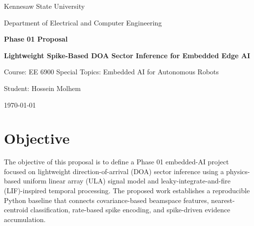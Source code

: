 \documentclass[11pt]{report}
\begin{document}
\begin{titlepage}
    \centering
    \vspace*{1.0in}

    {\Large Kennesaw State University\par}
    \vspace{0.25in}
    {\large Department of Electrical and Computer Engineering\par}

    \vspace{1.0in}

    {\LARGE\bfseries Phase 01 Proposal\par}
    \vspace{0.20in}
    {\Large\bfseries Lightweight Spike-Based DOA Sector Inference for Embedded Edge AI\par}

    \vspace{1.0in}

    {\large Course: EE 6900 Special Topics: Embedded AI for Autonomous Robots\par}
    \vspace{0.15in}
    {\large Student: Hossein Molhem\par}

    \vfill

    {\large \today\par}
\end{titlepage}


\chapter*{Objective}

The objective of this proposal is to define a Phase 01 embedded-AI project focused on lightweight direction-of-arrival (DOA) sector inference using a physics-based uniform linear array (ULA) signal model and leaky-integrate-and-fire (LIF)-inspired temporal processing. The proposed work establishes a reproducible Python baseline that connects covariance-based beamspace features, nearest-centroid classification, rate-based spike encoding, and spike-driven evidence accumulation.
\end{document}
